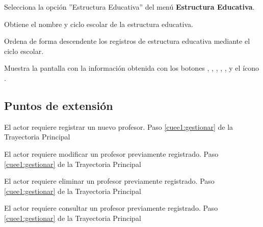 \begin{UCtrayectoria}
	
	\UCpaso [\UCactor] Selecciona la opción ''Estructura Educativa'' del menú \textbf{Estructura Educativa}.
	
	\UCpaso [\UCsist] Obtiene el nombre y ciclo escolar de la estructura educativa.
	
	\UCpaso [\UCsist] Ordena de forma descendente los registros de estructura educativa mediante el ciclo escolar.
	
	\UCpaso[\UCsist] Muestra la pantalla  con la información obtenida con los botones , ,  , , ,  y el ícono \btnRegistrar. \label{cuee1:gestionar}
\end{UCtrayectoria}

\subsection{Puntos de extensión}

\UCExtensionPoint 
{El actor requiere registrar un nuevo profesor.}
{Paso \ref{cuee1:gestionar} de la Trayectoria Principal}
{}

\UCExtensionPoint 
{El actor requiere modificar un profesor previamente registrado.}
{Paso \ref{cuee1:gestionar} de la Trayectoria Principal}
{}

\UCExtensionPoint 
{El actor requiere eliminar un profesor previamente registrado.}
{Paso \ref{cuee1:gestionar} de la Trayectoria Principal}
{}

\UCExtensionPoint 
{El actor requiere consultar un profesor previamente registrado.}
{Paso \ref{cuee1:gestionar} de la Trayectoria Principal}
{}


